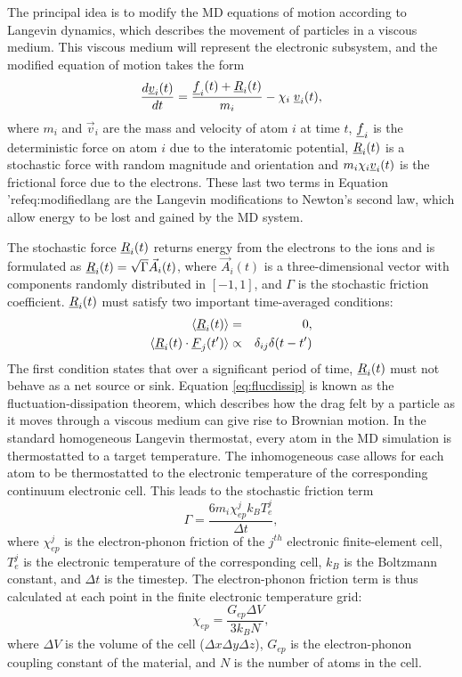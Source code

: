 The principal idea is to modify the MD equations of motion 
according to Langevin dynamics, which describes the movement 
of particles in a viscous medium. This viscous medium will represent 
the electronic subsystem, and the modified equation of motion takes 
the form
\begin{equation} \label{eq:modifiedlang}
{d \mbox{$\underline{v}$}_{i}(t) \over d t} = {{\mbox{$\underline{f}$}_{i}(t)+\mbox{$\underline{R}$}_{i}(t)} \over
m_{i}} - \chi_{i} \; \mbox{$\underline{v}$}_{i}(t),
\end{equation}
where $m_i$ and $\vec{v}_i$ are the mass and velocity of atom $i$ 
at time $t$, $\mbox{$\underline{f}$}_{i}$ is the deterministic force on atom $i$ due 
to the interatomic potential, $\mbox{$\underline{R}$}_{i}(t)$ is a stochastic force with 
random magnitude and orientation and $m_{i} \chi_{i} \mbox{$\underline{v}$}_{i}(t)$ 
is the frictional force due to the electrons. These last two terms in 
Equation 'ref{eq:modifiedlang} are the Langevin modifications to 
Newton's second law, which allow energy to be lost and gained by 
the MD system. 

The stochastic force $\mbox{$\underline{R}$}_{i}(t)$ returns energy from the 
electrons to the ions and is formulated as 
$\mbox{$\underline{R}$}_{i}(t) = \sqrt{\Gamma} \vec{A}_{i}(t)$, where $\vec{A}_{i}(t)$ 
is a three-dimensional vector with components randomly distributed 
in $[-1,1]$, and $\Gamma$ is the stochastic friction coefficient. 
$\mbox{$\underline{R}$}_{i}(t)$ must satisfy two important time-averaged conditions:
\begin{eqnarray}
\langle \mbox{$\underline{R}$}_{i}(t) \rangle &=& 0, \\
\langle \mbox{$\underline{R}$}_{i}(t) \cdot \mbox{$\underline{F}$}_{j}(t^{\prime}) \rangle &\propto& \delta_{ij} \delta (t-t^{\prime}) \label{eq:flucdissip}
\end{eqnarray}
The first condition states that over a significant period of time, 
$\mbox{$\underline{R}$}_{i}(t)$ must not behave as a net source or sink. Equation 
\ref{eq:flucdissip} is known as the fluctuation-dissipation theorem, 
which describes how the drag felt by a particle as it moves through 
a viscous medium can give rise to Brownian motion. In the standard 
homogeneous Langevin thermostat, every atom in the MD simulation 
is thermostatted to a target temperature. The inhomogeneous case 
allows for each atom to be thermostatted to the electronic temperature 
of the corresponding continuum electronic cell. This leads to the 
stochastic friction term
\begin{equation}
\Gamma = \frac{6 m_{i} \chi_{ep}^j k_B T_e^j}{\Delta t},
\end{equation}
where $\chi_{ep}^j$ is the electron-phonon friction of the $j^{th}$ 
electronic finite-element cell, $T_e^j$ is the electronic temperature 
of the corresponding cell, $k_B$ is the Boltzmann constant, and 
$\Delta t$ is the timestep. The electron-phonon friction term is thus 
calculated at each point in the finite electronic temperature grid:
\begin{equation} \label{eq:chiep}
\chi_{ep} = \frac{G_{ep} \Delta V}{3 k_B N},
\end{equation}
where $\Delta V$ is the volume of the cell ($\Delta x \Delta y \Delta z$), 
$G_{ep}$ is the electron-phonon coupling constant of the material, and 
$N$ is the number of atoms in the cell. 

